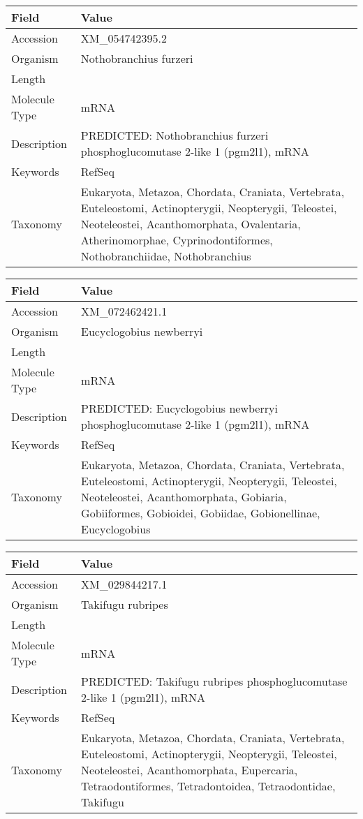 \documentclass[10pt]{article}
\begin{document}
\vspace{1em}
{\footnotesize
\begin{longtable}{>{\raggedright\arraybackslash}p{4.5cm} >{\raggedright\arraybackslash}p{11.5cm}}
\textbf{Field} & \textbf{Value} \\
\hline
Accession & XM\_054742395.2 \\
Organism & Nothobranchius furzeri \\
Length & 2982 \\
Molecule Type & mRNA \\
Description & PREDICTED: Nothobranchius furzeri phosphoglucomutase 2-like 1 (pgm2l1), mRNA \\
Keywords & RefSeq \\
Taxonomy & Eukaryota, Metazoa, Chordata, Craniata, Vertebrata, Euteleostomi, Actinopterygii, Neopterygii, Teleostei, Neoteleostei, Acanthomorphata, Ovalentaria, Atherinomorphae, Cyprinodontiformes, Nothobranchiidae, Nothobranchius \\
\end{longtable}
}

\vspace{1em}
{\footnotesize
\begin{longtable}{>{\raggedright\arraybackslash}p{4.5cm} >{\raggedright\arraybackslash}p{11.5cm}}
\textbf{Field} & \textbf{Value} \\
\hline
Accession & XM\_072462421.1 \\
Organism & Eucyclogobius newberryi \\
Length & 3030 \\
Molecule Type & mRNA \\
Description & PREDICTED: Eucyclogobius newberryi phosphoglucomutase 2-like 1 (pgm2l1), mRNA \\
Keywords & RefSeq \\
Taxonomy & Eukaryota, Metazoa, Chordata, Craniata, Vertebrata, Euteleostomi, Actinopterygii, Neopterygii, Teleostei, Neoteleostei, Acanthomorphata, Gobiaria, Gobiiformes, Gobioidei, Gobiidae, Gobionellinae, Eucyclogobius \\
\end{longtable}
}

\vspace{1em}
{\footnotesize
\begin{longtable}{>{\raggedright\arraybackslash}p{4.5cm} >{\raggedright\arraybackslash}p{11.5cm}}
\textbf{Field} & \textbf{Value} \\
\hline
Accession & XM\_029844217.1 \\
Organism & Takifugu rubripes \\
Length & 2654 \\
Molecule Type & mRNA \\
Description & PREDICTED: Takifugu rubripes phosphoglucomutase 2-like 1 (pgm2l1), mRNA \\
Keywords & RefSeq \\
Taxonomy & Eukaryota, Metazoa, Chordata, Craniata, Vertebrata, Euteleostomi, Actinopterygii, Neopterygii, Teleostei, Neoteleostei, Acanthomorphata, Eupercaria, Tetraodontiformes, Tetradontoidea, Tetraodontidae, Takifugu \\
\end{longtable}
}
\end{document}
